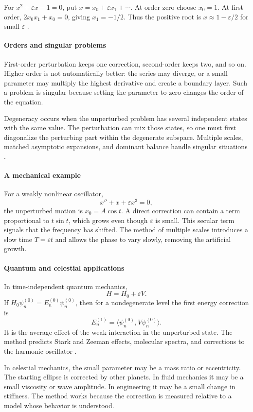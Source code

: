For $x^2+\varepsilon x-1=0$, put $x=x_0+\varepsilon x_1+\cdots$. At order zero choose $x_0=1$. At first order, $2x_0x_1+x_0=0$, giving $x_1=-1/2$. Thus the positive root is $x\approx1-\varepsilon/2$ for small $\varepsilon$ \cite{perturbation_ref1}.

\paragraph{Orders and singular problems}
First-order perturbation keeps one correction, second-order keeps two, and so on. Higher order is not automatically better: the series may diverge, or a small parameter may multiply the highest derivative and create a boundary layer. Such a problem is singular because setting the parameter to zero changes the order of the equation.

Degeneracy occurs when the unperturbed problem has several independent states with the same value. The perturbation can mix those states, so one must first diagonalize the perturbing part within the degenerate subspace. Multiple scales, matched asymptotic expansions, and dominant balance handle singular situations \cite{perturbation_ref2}.

\paragraph{A mechanical example}
For a weakly nonlinear oscillator,
\[
x''+x+\varepsilon x^3=0,
\]
the unperturbed motion is $x_0=A\cos t$. A direct correction can contain a term proportional to $t\sin t$, which grows even though $\varepsilon$ is small. This secular term signals that the frequency has shifted. The method of multiple scales introduces a slow time $T=\varepsilon t$ and allows the phase to vary slowly, removing the artificial growth.

\paragraph{Quantum and celestial applications}
In time-independent quantum mechanics,
\[
H=H_0+\varepsilon V.
\]
If $H_0\psi_n^{(0)}=E_n^{(0)}\psi_n^{(0)}$, then for a nondegenerate level the first energy correction is
\[
E_n^{(1)}=\langle\psi_n^{(0)},V\psi_n^{(0)}\rangle.
\]
It is the average effect of the weak interaction in the unperturbed state. The method predicts Stark and Zeeman effects, molecular spectra, and corrections to the harmonic oscillator \cite{perturbation_ref3}.

In celestial mechanics, the small parameter may be a mass ratio or eccentricity. The starting ellipse is corrected by other planets. In fluid mechanics it may be a small viscosity or wave amplitude. In engineering it may be a small change in stiffness. The method works because the correction is measured relative to a model whose behavior is understood.

